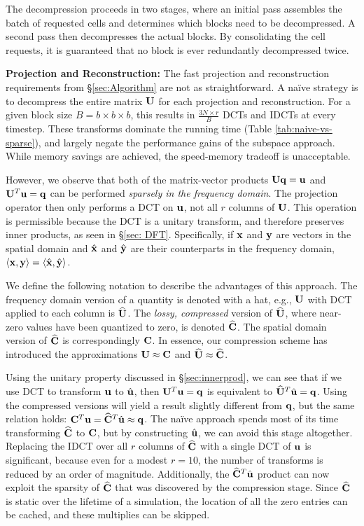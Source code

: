 The decompression proceeds in two stages, where an initial pass assembles the batch of requested cells and determines which blocks need to be decompressed. A second pass then decompresses the actual blocks. By consolidating the cell requests, it is guaranteed that no block is ever redundantly decompressed twice.

\noindent \textbf{Projection and Reconstruction:} The fast projection and reconstruction requirements from \S\ref{sec:Algorithm} are not as straightforward. A na\"{i}ve strategy is to decompress the entire matrix $\mathbf{U}$ for each projection and reconstruction. For a given block size $B = b \times b \times b$, this results in $\frac{3N \times r}{B}$ DCTs and IDCTs at every timestep. These transforms dominate the running time (Table \ref{tab:naive-vs-sparse}), and largely negate the performance gains of the subspace approach. While memory savings are achieved, the speed-memory tradeoff is unacceptable.

However, we observe that both of the matrix-vector products $\mathbf{U}\mathbf{q} = \mathbf{u}$ and $\mathbf{U}^T\mathbf{u} = \mathbf{q}$ can be performed {\em sparsely in the frequency domain}. The projection operator then only performs a DCT on $\mathbf{u}$, not all $r$ columns of $\mathbf{U}$. This operation is permissible because the DCT is a unitary transform, and therefore preserves inner products, as seen in \S\ref{sec: DFT}. Specifically, if $\mathbf{x}$ and $\mathbf{y}$ are vectors in the spatial domain and $\hat{\mathbf{x}}$ and $\hat{\mathbf{y}}$ are their counterparts in the frequency domain, $\langle \mathbf{x}, \mathbf{y} \rangle = \langle \hat{\mathbf{x}}, \hat{\mathbf{y}} \rangle$.

We define the following notation to describe the advantages of this approach. The frequency domain version of a quantity is denoted with a hat, e.g., $\mathbf{U}$ with DCT applied to each column is $\widehat{\mathbf{U}}$. The {\em lossy, compressed} version of $\widehat{\mathbf{U}}$, where near-zero values have been quantized to zero, is denoted $\widehat{\mathbf{C}}$. The spatial domain version of $\widehat{\mathbf{C}}$ is correspondingly $\mathbf{C}$. In essence, our compression scheme has introduced the approximations $\mathbf{U} \approx \mathbf{C}$ and $\widehat{\mathbf{U}} \approx \widehat{\mathbf{C}}$.

Using the unitary property discussed in \S\ref{sec:innerprod}, we can see that if we use DCT to transform $\mathbf{u}$ to $\hat{\mathbf{u}}$, then $\mathbf{U}^T\mathbf{u} = \mathbf{q}$ is equivalent to $\widehat{\mathbf{U}}^T\hat{\mathbf{u}} = \mathbf{q}$. Using the compressed versions will yield a result slightly different from $\mathbf{q}$, but the same relation holds: $\mathbf{C}^T\mathbf{u} = \widehat{\mathbf{C}}^T\hat{\mathbf{u}} \approx \mathbf{q}$. The na\"{i}ve approach spends most of its time transforming $\widehat{\mathbf{C}}$ to $\mathbf{C}$, but by constructing $\hat{\mathbf{u}}$, we can avoid this stage altogether. Replacing the IDCT over all $r$ columns of $\widehat{\mathbf{C}}$ with a single DCT of $\mathbf{u}$ is significant, because even for a modest $r = 10$, the number of transforms is reduced by an order of magnitude. Additionally, the $\widehat{\mathbf{C}}^T\hat{\mathbf{u}}$ product can now exploit the sparsity of $\widehat{\mathbf{C}}$ that was discovered by the compression stage. Since $\widehat{\mathbf{C}}$ is static over the lifetime of a simulation, the location of all the zero entries can be cached, and these multiplies can be skipped. 

